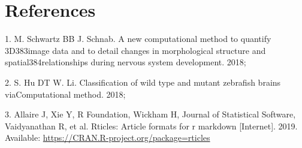 \documentclass[10pt,letterpaper]{article}
\begin{document}
\hypertarget{references}{%
\section*{References}\label{references}}

\hypertarget{refs}{}
\leavevmode\hypertarget{ref-Schwartz18}{}%
1. M. Schwartz BB J. Schnab. A new computational method to quantify
3D383image data and to detail changes in morphological structure and
spatial384relationships during nervous system development. 2018;

\leavevmode\hypertarget{ref-Hu18}{}%
2. S. Hu DT W. Li. Classification of wild type and mutant zebrafish
brains viaComputational method. 2018;

\leavevmode\hypertarget{ref-rticles19}{}%
3. Allaire J, Xie Y, R Foundation, Wickham H, Journal of Statistical
Software, Vaidyanathan R, et al. Rticles: Article formats for r markdown
{[}Internet{]}. 2019. Available:
\url{https://CRAN.R-project.org/package=rticles}

\nolinenumbers
\end{document}
